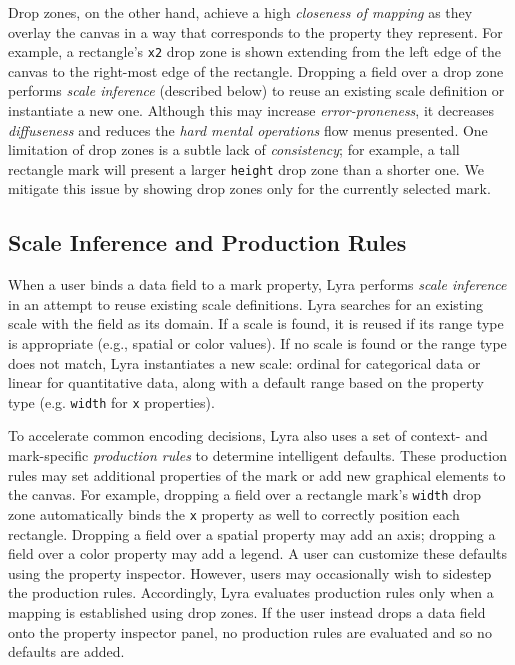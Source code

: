 Drop zones, on the other hand, achieve a high \emph{closeness of mapping} as
they overlay the canvas in a way that corresponds to the property they
represent. For example, a rectangle's \texttt{x2} drop zone is shown extending
from the left edge of the canvas to the right-most edge of the rectangle.
Dropping a field over a drop zone performs \emph{scale inference} (described
below) to reuse an existing scale definition or instantiate a new one. Although
this may increase \emph{error-proneness}, it decreases \emph{diffuseness} and
reduces the \emph{hard mental operations} flow menus presented. One limitation
of drop zones is a subtle lack of \emph{consistency}; for example, a tall
rectangle mark will present a larger \texttt{height} drop zone than a shorter
one. We mitigate this issue by showing drop zones only for the currently
selected mark.

\vspace{-10pt}

\subsection{Scale Inference and Production Rules}

\vspace{-7pt}

When a user binds a data field to a mark property, Lyra performs \emph{scale
inference} in an attempt to reuse existing scale definitions. Lyra searches for
an existing scale with the field as its domain. If a scale is found, it is
reused if its range type is appropriate (e.g., spatial or color values). If no
scale is found or the range type does not match, Lyra instantiates a new scale:
ordinal for categorical data or linear for quantitative data, along with a
default range based on the property type (e.g. \texttt{width} for \texttt{x}
properties).

To accelerate common encoding decisions, Lyra also uses a set of context- and
mark-specific \emph{production rules} to determine intelligent defaults. These
production rules may set additional properties of the mark or add new graphical
elements to the canvas. For example, dropping a field over a rectangle mark's
\texttt{width} drop zone automatically binds the \texttt{x} property as well to
correctly position each rectangle. Dropping a field over a spatial property may
add an axis; dropping a field over a color property may add a legend. A user can
customize these defaults using the property inspector. However, users may
occasionally wish to sidestep the production rules. Accordingly, Lyra evaluates
production rules only when a mapping is established using drop zones. If the
user instead drops a data field onto the property inspector panel, no production
rules are evaluated and so no defaults are added.

